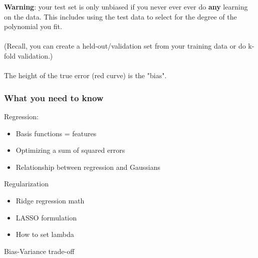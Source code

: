 \textbf{Warning}: your test set is only unbiased if you never ever ever do \textbf{any} learning on the data. 
This includes using the test data to select for the degree of the polynomial you fit.   \hfill \\  \hfill \\
(Recall, you can create a held-out/validation set from your training data or do k-fold validation.)  \hfill \\
\hfill \\

The height of the true error (red curve) is the "bias".  \hfill \\

\subsubsection{What you need to know}
Regression:
\begin{itemize}
	\item Basis functions = features
	\item Optimizing a sum of squared errors
	\item Relationship between regression and Gaussians
\end{itemize}
Regularization
\begin{itemize}
	\item Ridge regression math
	\item LASSO formulation
	\item How to set lambda
\end{itemize}
Bias-Variance trade-off





